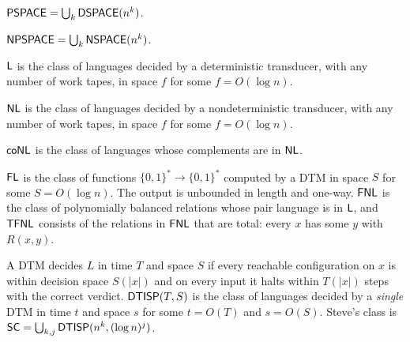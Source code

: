 \begin{definition}
  \label{def:PSPACE}
  \leanok
  $\mathsf{PSPACE} = \bigcup_{k} \mathsf{DSPACE}(n^k)$.
\end{definition}

\begin{definition}
  \label{def:NPSPACE}
  \leanok
  $\mathsf{NPSPACE} = \bigcup_{k} \mathsf{NSPACE}(n^k)$.
\end{definition}

\begin{definition}
  \label{def:L}
  \leanok
  $\mathsf{L}$ is the class of languages decided by a deterministic transducer,
  with any number of work tapes, in space $f$ for some $f = O(\log n)$.
\end{definition}

\begin{definition}
  \label{def:NL}
  \leanok
  $\mathsf{NL}$ is the class of languages decided by a nondeterministic
  transducer, with any number of work tapes, in space $f$ for some
  $f = O(\log n)$.
\end{definition}

\begin{definition}[Complement of NL]
  \label{def:coNL}
  \leanok
  $\mathsf{coNL}$ is the class of languages whose complements are in $\mathsf{NL}$.
\end{definition}

\begin{definition}
  \label{def:FL}
  \leanok
  $\mathsf{FL}$ is the class of functions $\{0,1\}^* \to \{0,1\}^*$ computed by a
  DTM in space $S$ for some $S = O(\log n)$. The output is unbounded in length
  and one-way. $\mathsf{FNL}$ is the class of polynomially balanced relations whose
  pair language is in $\mathsf{L}$, and $\mathsf{TFNL}$ consists of the relations in
  $\mathsf{FNL}$ that are total: every $x$ has some $y$ with $R(x, y)$.
\end{definition}

\begin{definition}
  \label{def:space-dtisp}
  \leanok
  A DTM decides $L$ in time $T$ and space $S$ if every reachable configuration
  on $x$ is within decision space $S(|x|)$ and on every input it halts within
  $T(|x|)$ steps with the correct verdict. $\mathsf{DTISP}(T, S)$ is the class of
  languages decided by a \emph{single} DTM in time $t$ and space $s$ for some
  $t = O(T)$ and $s = O(S)$. Steve's class is
  $\mathsf{SC} = \bigcup_{k, j} \mathsf{DTISP}(n^k, (\log n)^j)$.
\end{definition}


